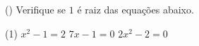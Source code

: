 \begin{question} () %
Verifique se $1$ é raiz das equações abaixo.


\begin{tasks}(1)
        \task $x^2-1=2$
        \task $7x-1=0$
        \task $2x^2-2=0$   
    \end{tasks}
\end{question}


   